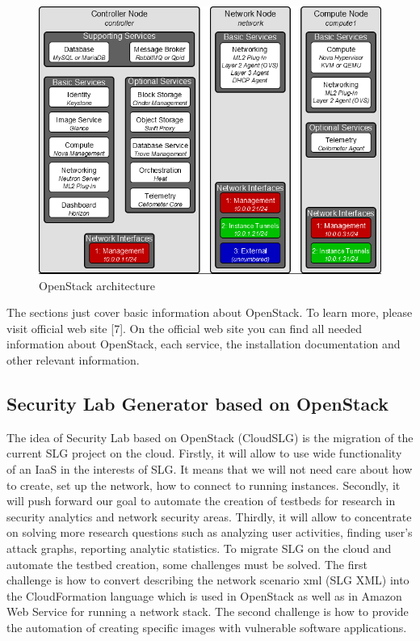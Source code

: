 \begin{figure}[ht!]
\centering
\includegraphics[width=\textwidth]{openstack_architecture.png}
\caption{OpenStack architecture}
\label{overflow}
\end{figure}

The sections just cover basic information about OpenStack. To learn more, please visit official web site [7]. On the official web site you can find all needed information about OpenStack, each service, the installation documentation and other relevant information. 


\subsection{Security Lab Generator based on OpenStack}
The idea of Security Lab based on OpenStack (CloudSLG) is the migration of the current SLG project on the cloud. Firstly, it will allow to use wide functionality of an IaaS in the interests of SLG. It means that we will not need care about how to create, set up the network, how to connect to running instances. Secondly, it will push forward our goal to automate the creation of testbeds for research in security analytics and network security areas. Thirdly, it will allow to concentrate on solving more research questions such as analyzing user activities, finding user's attack graphs, reporting analytic statistics. To migrate SLG on the cloud and automate the testbed creation, some challenges must be solved. The first challenge is how to convert describing the network scenario xml (SLG XML) into the CloudFormation language which is used in OpenStack as well as in Amazon Web Service for running a network stack. The second challenge is how to provide the automation of creating specific images with vulnerable software applications.



% 
